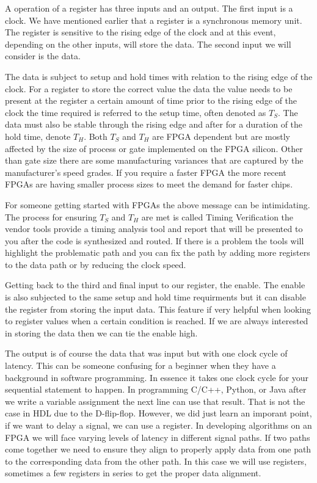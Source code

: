 A operation of a register has three inputs and an output. The first input is a clock. We have mentioned earlier that a register is a synchronous memory unit. The register is sensitive to the rising edge of the clock and at this event, depending on the other inputs, will store the data. The second input we will consider is the data. 

The data is subject to setup and hold times with relation to the rising edge of the clock. For a register to store the correct value the data the value needs to be present at the register a certain amount of time prior to the rising edge of the clock the time required is referred to the setup time, often denoted as $T_S$. The data must also be stable through the rising edge and after for a duration of the hold time, denote $T_H$. Both $T_S$ and $T_H$ are \ac{FPGA} dependent but are mostly affected by the size of process or gate implemented on the \ac{FPGA} silicon. Other than gate size there are some manufacturing variances that are captured by the manufacturer's speed grades. If you require a faster \ac{FPGA} the more recent \ac{FPGA}s are having smaller process sizes to meet the demand for faster chips. 

For someone getting started with \ac{FPGA}s the above message can be intimidating. The process for ensuring $T_S$ and $T_H$ are met is called \ac{Timing Verification} the vendor tools provide a timing analysis tool and report that will be presented to you after the code is synthesized and routed. If there is a problem the tools will highlight the problematic path and you can fix the path by adding more registers to the data path or by reducing the clock speed. 

Getting back to the third and final input to our register, the enable. The enable is also subjected to the same setup and hold time requirments but it can disable the register from storing the input data. This feature if very helpful when looking to register values when a certain condition is reached. If we are always interested in storing the data then we can tie the enable high.

The output is of course the data that was input but with one clock cycle of latency. This can be someone confusing for a beginner when they have a background in software programming. In essence it takes one clock cycle for your sequential statement to happen. In programming C/C++, Python, or Java after we write a variable assignment the next line can use that result. That is not the case in \ac{HDL} due to the D-flip-flop. However, we did just learn an imporant point, if we want to delay a signal, we can use a register. In developing algorithms on an \ac{FPGA} we will face varying levels of latency in different signal paths. If two paths come together we need to ensure they align to properly apply data from one path to the corresponding data from the other path. In this case we will use registers, sometimes a few registers in series to get the proper data alignment. 

